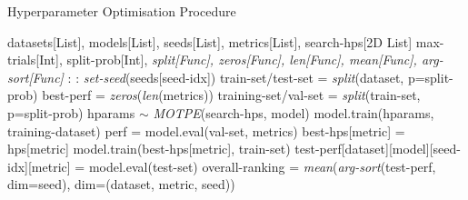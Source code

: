 \documentclass[12pt]{article}
\begin{document}
\begin{algorithm}[H]
        \caption{Hyperparameter Optimisation Procedure} 
    	\begin{algorithmic}[1]
            \Require datasets[List], models[List], seeds[List], metrics[List], search-hps[2D List] max-trials[Int], split-prob[Int], \textit{split[Func], zeros[Func], len[Func], mean[Func], arg-sort[Func]}
            :
                :
                        \State \textit{set-seed}(seeds[seed-idx])
                        \State train-set/test-set = \textit{split}(dataset, p=split-prob)
                            \State best-perf = \textit{zeros}(\textit{len}(metrics))
                            \State training-set/val-set =  \textit{split}(train-set, p=split-prob)
                                \State hparams $\sim$ \textit{MOTPE}(search-hps, model)
                                \State model.train(hparams, training-dataset)
                                \State perf = model.eval(val-set, metrics)
                                        \State best-hps[metric] = hps[metric]
                                    \EndIf
                                \EndFor
                            \EndFor
                        \EndIf
                            \State model.train(best-hps[metric], train-set)
                            \State test-perf[dataset][model][seed-idx][metric] = model.eval(test-set)
                        \EndFor
            	\EndFor
                \EndFor
            \EndFor
            \State overall-ranking = \textit{mean}(\textit{arg-sort}(test-perf, dim=seed), dim=(dataset, metric, seed))
            
    	\end{algorithmic} 
        \label{algo: hpo}
    \end{algorithm}
\end{document}
